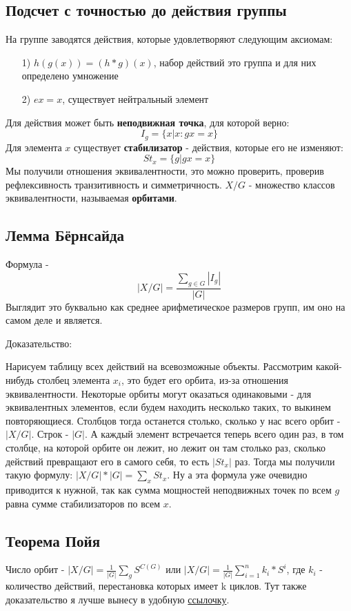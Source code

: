 \documentclass{article}
\begin{document}
\subsection{Подсчет с точностью до действия группы}
На группе заводятся действия, которые удовлетворяют следующим аксиомам:
\begin{enumerate}
    \item[1)] $h(g(x))=(h*g)(x)$, набор действий это группа и для них определено умножение
    \item[2)] $ex=x$, существует нейтральный элемент
\end{enumerate}
Для действия может быть \textbf{неподвижная точка}, для которой верно:$$I_g=\{x|x : gx=x\}$$
Для элемента $x$ существует \textbf{стабилизатор} - действия, которые его не изменяют:$$St_x = \{g|gx=x\}$$
Мы получили отношения эквивалентности, это можно проверить, проверив рефлексивность транзитивность и симметричность.
$X/G$ - множество классов эквивалентности, называемая \textbf{орбитами}.
\subsection{Лемма Бёрнсайда}
Формула - $$\displaystyle\left|X/G\right|=\frac{\sum\limits_{g\in G}|I_g|}{|G|}$$ Выглядит это буквально как среднее арифметическое размеров групп, им оно на самом деле и является.

Доказательство:

Нарисуем таблицу всех действий на всевозможные объекты. Рассмотрим какой-нибудь столбец элемента $x_i$, это будет его орбита, из-за отношения эквивалентности. Некоторые орбиты могут оказаться одинаковыми - для эквивалентных элементов, если будем находить несколько таких, то выкинем повторяющиеся. Столбцов тогда останется столько, сколько у нас всего орбит - $|X/G|$. Строк - $|G|$. А каждый элемент встречается теперь всего один раз, в том столбце, на которой орбите он лежит, но лежит он там столько раз, сколько действий превращают его в самого себя, то есть $|St_x|$ раз. Тогда мы получили такую формулу: $|X/G|*|G|=\sum\limits_x{St_x}$. Ну а эта формула уже очевидно приводится к нужной, так как сумма мощностей неподвижных точек по всем $g$ равна сумме стабилизаторов по всем $x$.  
\subsection{Теорема Пойя}
Число орбит - $|X/G| = \frac{1}{|G|}\sum\limits_g{S^{C(G)}}$ или $|X/G| = \frac{1}{|G|}\sum\limits_{i=1}^n{k_i*S^{i}}$, где $k_i$ - количество действий, перестановка которых имеет k циклов. 
Тут также доказательство я лучше вынесу в удобную \href{https://neerc.ifmo.ru/wiki/index.php?title=%D0%9B%D0%B5%D0%BC%D0%BC%D0%B0_%D0%91%D1%91%D1%80%D0%BD%D1%81%D0%B0%D0%B9%D0%B4%D0%B0_%D0%B8_%D0%A2%D0%B5%D0%BE%D1%80%D0%B5%D0%BC%D0%B0_%D0%9F%D0%BE%D0%B9%D0%B0}{ссылочку}.
\end{document}

